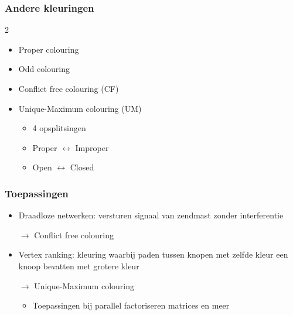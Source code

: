 \documentclass
[kulak] %
{kulakbeamer}
\begin{document}
	\begin{frame}
		\frametitle{Andere kleuringen}
		
		
		\begin{multicols}{2}
			
			\begin{itemize}
				\item Proper colouring
				\item Odd colouring
				\item Conflict free colouring (CF)
				\item Unique-Maximum colouring (UM)
				\pause
				\begin{itemize}
					\item 4 opsplitsingen
					\item Proper $\longleftrightarrow$ Improper
					\item Open $\longleftrightarrow$ Closed
				\end{itemize}
			\end{itemize}
			
			\vspace*{\fill}\null
			
			\begin{center}
				\scalebox{.75}{}
			\end{center}
			

			
		\end{multicols}
		
		
	\end{frame}
	
	\begin{frame}
		\frametitle{Toepassingen}
		\begin{itemize}
			\item Draadloze netwerken: versturen signaal van zendmast zonder interferentie 
			
			$\rightarrow$ Conflict free colouring
			\item Vertex ranking: kleuring waarbij paden tussen knopen met zelfde kleur een knoop bevatten met grotere kleur 
			
			$\rightarrow$ Unique-Maximum colouring
			\begin{itemize}
				\item Toepassingen bij parallel factoriseren matrices en meer
			\end{itemize}
		\end{itemize}
	\end{frame}
	
\end{document}
